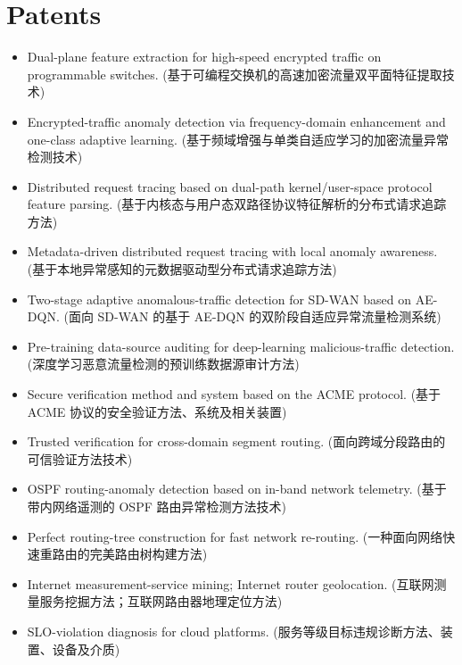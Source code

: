 \documentclass[11pt]{article}
\newcommand{\cn}[1]{#1}
\begin{document}
\section{Patents}
\begin{itemize}
  \item Dual-plane feature extraction for high-speed encrypted traffic on programmable
        switches. (\cn{基于可编程交换机的高速加密流量双平面特征提取技术})
  \item Encrypted-traffic anomaly detection via frequency-domain enhancement and
        one-class adaptive learning.
        (\cn{基于频域增强与单类自适应学习的加密流量异常检测技术})
  \item Distributed request tracing based on dual-path kernel/user-space protocol
        feature parsing. (\cn{基于内核态与用户态双路径协议特征解析的分布式请求追踪方法})
  \item Metadata-driven distributed request tracing with local anomaly awareness.
        (\cn{基于本地异常感知的元数据驱动型分布式请求追踪方法})
  \item Two-stage adaptive anomalous-traffic detection for SD-WAN based on AE-DQN.
        (\cn{面向 SD-WAN 的基于 AE-DQN 的双阶段自适应异常流量检测系统})
  \item Pre-training data-source auditing for deep-learning malicious-traffic
        detection. (\cn{深度学习恶意流量检测的预训练数据源审计方法})
  \item Secure verification method and system based on the ACME protocol.
        (\cn{基于 ACME 协议的安全验证方法、系统及相关装置})
  \item Trusted verification for cross-domain segment routing.
        (\cn{面向跨域分段路由的可信验证方法技术})
  \item OSPF routing-anomaly detection based on in-band network telemetry.
        (\cn{基于带内网络遥测的 OSPF 路由异常检测方法技术})
  \item Perfect routing-tree construction for fast network re-routing.
        (\cn{一种面向网络快速重路由的完美路由树构建方法})
  \item Internet measurement-service mining; Internet router geolocation.
        (\cn{互联网测量服务挖掘方法；互联网路由器地理定位方法})
  \item SLO-violation diagnosis for cloud platforms.
        (\cn{服务等级目标违规诊断方法、装置、设备及介质})
\end{itemize}
\end{document}
